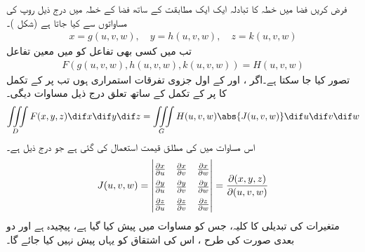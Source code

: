 فرض کریں  فضا میں خطہ  کا تبادلہ  ایک ایک مطابقت کے  ساتھ  فضا کے خطہ  میں درج ذیل  روپ کی مساواتوں  سے کیا جاتا ہے (شکل )۔
\begin{align*}
x=g(u,v,w),\quad y=h(u,v,w),\quad z=k(u,v,w)
\end{align*}
تب  میں کسی بھی تفاعل  کو  میں   معین  تفاعل
\begin{align*}
F(g(u,v,w),h(u,v,w),k(u,v,w))=H(u,v,w)
\end{align*}
تصور کیا جا سکتا ہے۔اگر ،   اور  کے اول جزوی تفرقات استمراری ہوں تب  پر  کے تکمل کا  پر  کے تکمل کے ساتھ تعلق درج ذیل مساوات دیگی۔
  \begin{align}\label{مساوات_بالکثرت_یعقوبی_تہرا_تکمل}
\iiint\limits_D F(x,y,z)\dif x\dif y\dif z=\iiint\limits_G H(u,v,w)\abs{J(u,v,w)}\dif u\dif v\dif w
\end{align}
اس مساوات میں  کی مطلق قیمت استعمال کی گئی ہے جو درج ذیل  ہے۔
\begin{align}
\renewcommand{\arraystretch}{1.5}
J(u,v,w)=\begin{vmatrix}
\frac{\partial x}{\partial u}&\frac{\partial x}{\partial v}&\frac{\partial x}{\partial w}\\
\frac{\partial y}{\partial u}&\frac{\partial y}{\partial v}&\frac{\partial y}{\partial w}\\
\frac{\partial z}{\partial u}&\frac{\partial z}{\partial v}&\frac{\partial z}{\partial w}
\end{vmatrix}=\frac{\partial(x,y,z)}{\partial(u,v,w)}
\end{align} 
متغیرات کی تبدیلی کا    کلیہ، جس کو مساوات  میں پیش کیا گیا ہے، پیچیدہ ہے اور دو بعدی صورت کی طرح ، اس کی اشتقاق کو یہاں پیش نہیں کیا جائے گا۔
